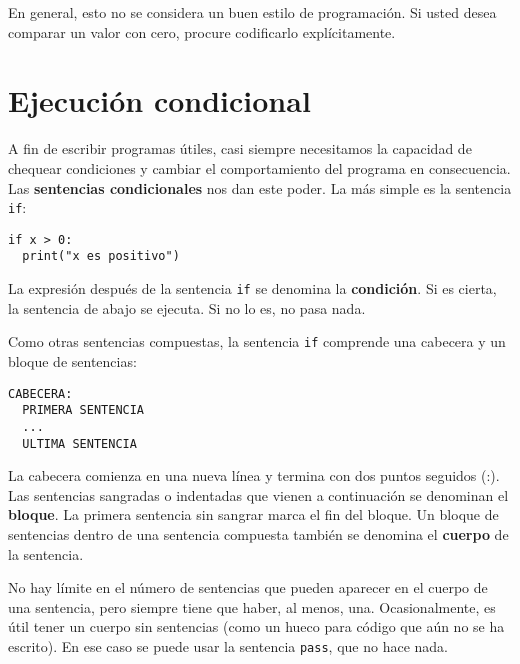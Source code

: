En general, esto no se considera un buen estilo de programación. Si
usted desea comparar un valor con cero, procure codificarlo explícitamente.

\section{Ejecución condicional}

\label{alternative execution} 

A fin de escribir programas útiles, casi siempre necesitamos la capacidad
de chequear condiciones y cambiar el comportamiento del programa en
consecuencia. Las \textbf{sentencias condicionales} nos dan este poder.
La más simple es la sentencia \texttt{if}: 
\begin{lstlisting}
if x > 0:
  print("x es positivo")
\end{lstlisting}

La expresión después de la sentencia \texttt{if} se denomina la \textbf{condición}.
Si es cierta, la sentencia de abajo se ejecuta. Si no lo es, no pasa
nada.

 
 

Como otras sentencias compuestas, la sentencia \texttt{if} comprende
una cabecera y un bloque de sentencias:
\begin{verbatim}
CABECERA:
  PRIMERA SENTENCIA
  ...
  ULTIMA SENTENCIA
\end{verbatim}
La cabecera comienza en una nueva línea y termina con dos puntos seguidos
(:). Las sentencias sangradas o indentadas que vienen a continuación
se denominan el \textbf{bloque}. La primera sentencia sin sangrar
marca el fin del bloque. Un bloque de sentencias dentro de una sentencia
compuesta también se denomina el \textbf{cuerpo} de la sentencia.

  

No hay límite en el número de sentencias que pueden aparecer en el
cuerpo de una sentencia, pero siempre tiene que haber, al menos, una.
Ocasionalmente, es útil tener un cuerpo sin sentencias (como un hueco
para código que aún no se ha escrito). En ese caso se puede usar la
sentencia \texttt{pass}, que no hace nada.

 

